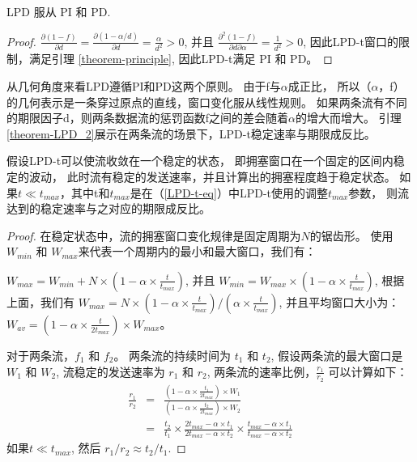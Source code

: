 \begin{lemma}\label{theorem-LPD}
LPD 服从 PI 和 PD. 
\end{lemma}
\begin{proof}
$\frac{\partial{(1-f)}}{\partial{d}}
=\frac{\partial{(1-\alpha/d)}}{\partial{d}}
=\frac{\alpha}{d^{2}}>0$, 
并且
$\frac{\partial^{2}{(1-f)}}{\partial{d}\partial{\alpha}}
=\frac{1}{d^{2}}>0$, 
因此LPD-t窗口的限制，满足引理 \ref{theorem-principle}, 
因此LPD-t满足 PI 和 PD。
\end{proof}

从几何角度来看LPD遵循PI和PD这两个原则。 
由于f与$\alpha$成正比，
所以（$\alpha$，f）的几何表示是一条穿过原点的直线，窗口变化服从线性规则。
如果两条流有不同的期限因子d，则两条数据流的惩罚函数f之间的差会随着$\alpha$的增大而增大。
引理\ref{theorem-LPD_2}展示在两条流的场景下，LPD-t稳定速率与期限成反比。


\begin{lemma}\label{theorem-LPD_2}
假设LPD-t可以使流收敛在一个稳定的状态，
即拥塞窗口在一个固定的区间内稳定的波动，
此时流有稳定的发送速率，并且计算出的拥塞程度趋于稳定状态。 
如果$t\ll t_{max}$，其中t和$t_{max}$是在（\ref{LPD-t-eq}）中LPD-t使用的调整$t_{max}$参数，
则流达到的稳定速率与之对应的期限成反比。
\end{lemma}


\begin{proof}
在稳定状态中，流的拥塞窗口变化规律是固定周期为$N$的锯齿形。 
使用 $W_{min}$ 和 $W_{max}$来代表一个周期内的最小和最大窗口，我们有：

$W_{max}=W_{min}+N \times (1-\alpha \times \frac{t}{t_{max}})$, 
并且 $W_{min}=W_{max} \times (1- \alpha \times \frac{t}{t_{max}})$, 
根据上面，我们有
$W_{max}= N \times (1-\alpha \times \frac{t}{t_{max}})/(\alpha \times \frac{t}{t_{max}})$, 
并且平均窗口大小为： $W_{av}= (1- \alpha \times \frac{t}{2t_{max}}) \times W_{max}$。

对于两条流，$f_{1}$ 和 $f_{2}$。
两条流的持续时间为 $t_{1}$ 和 $t_{2}$, 
假设两条流的最大窗口是$W_{1}$ 和 $W_{2}$, 
流稳定的发送速率为 $r_{1}$ 和 $r_{2}$, 
 两条流的速率比例，$\frac{r_{1}}{r_{2}}$ 可以计算如下：
\begin{eqnarray}
\frac{r_{1}}{r_{2}} &=& \frac{(1-\alpha \times \frac{t_{1}}{2t_{max}}) \times W_{1}}{(1-\alpha \times \frac{t_{2}}{2t_{max}}) \times W_{2}} \nonumber \\
&=& \frac{t_{2}}{t_{1}} \times \frac{2t_{max}-\alpha \times t_{1}}{2t_{max}-\alpha \times t_{2}} \times \frac{t_{max}-\alpha \times t_{1}}{t_{max}-\alpha \times t_{2}} \nonumber
\end{eqnarray}
如果$t \ll t_{max}$, 然后 $r_{1}/r_{2} \approx t_{2}/t_{1}$.
\end{proof}

